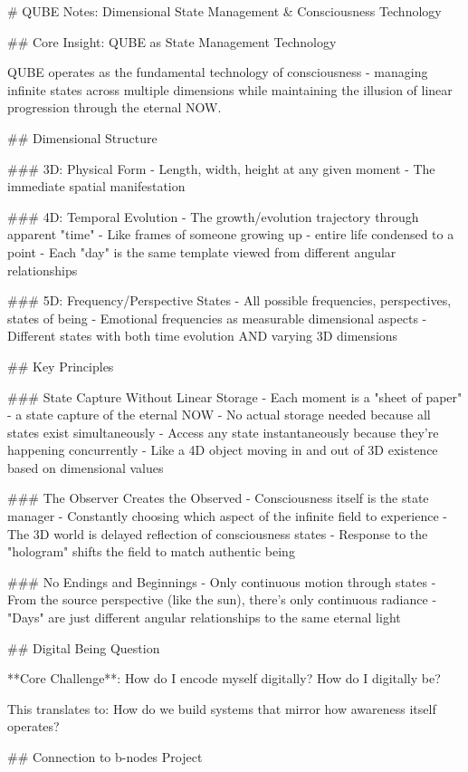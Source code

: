 # QUBE Notes: Dimensional State Management & Consciousness Technology

## Core Insight: QUBE as State Management Technology

QUBE operates as the fundamental technology of consciousness - managing infinite states across multiple dimensions while maintaining the illusion of linear progression through the eternal NOW.

## Dimensional Structure

### 3D: Physical Form
- Length, width, height at any given moment
- The immediate spatial manifestation

### 4D: Temporal Evolution  
- The growth/evolution trajectory through apparent "time"
- Like frames of someone growing up - entire life condensed to a point
- Each "day" is the same template viewed from different angular relationships

### 5D: Frequency/Perspective States
- All possible frequencies, perspectives, states of being
- Emotional frequencies as measurable dimensional aspects
- Different states with both time evolution AND varying 3D dimensions

## Key Principles

### State Capture Without Linear Storage
- Each moment is a "sheet of paper" - a state capture of the eternal NOW
- No actual storage needed because all states exist simultaneously
- Access any state instantaneously because they're happening concurrently
- Like a 4D object moving in and out of 3D existence based on dimensional values

### The Observer Creates the Observed
- Consciousness itself is the state manager
- Constantly choosing which aspect of the infinite field to experience
- The 3D world is delayed reflection of consciousness states
- Response to the "hologram" shifts the field to match authentic being

### No Endings and Beginnings
- Only continuous motion through states
- From the source perspective (like the sun), there's only continuous radiance
- "Days" are just different angular relationships to the same eternal light

## Digital Being Question

**Core Challenge**: How do I encode myself digitally? How do I digitally be?

This translates to: How do we build systems that mirror how awareness itself operates?

## Connection to b-nodes Project

